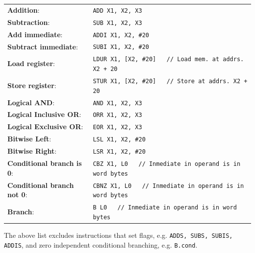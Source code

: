 \documentclass[11pt]{article}
\begin{document}
\begin{tcolorbox}[
    enhanced,
    attach boxed title to top left={xshift=6mm,yshift=-1.5mm},
    colback=moonstoneblue!20,
    colframe=moonstoneblue,
    colbacktitle=moonstoneblue,
    title=Relevant LEGv8 instructions,
    fonttitle=\bfseries\color{white},
    boxed title style={size=small,colframe=moonstoneblue,sharp corners},
    sharp corners,
]
    \begin{tabular}{@{} l @{\quad} l @{}}
    {\color{moondark}\textbf{Addition}}:           & \texttt{ADD X1, X2, X3}     \\
    {\color{moondark}\textbf{Subtraction}}:        & \texttt{SUB X1, X2, X3}     \\
    {\color{moondark}\textbf{Add immediate}}:      & \texttt{ADDI X1, X2, \#20}  \\
    {\color{moondark}\textbf{Subtract immediate}}: & \texttt{SUBI X1, X2, \#20}  \\
    {\color{moondark}\textbf{Load register}}:      & \texttt{LDUR X1, [X2, \#20] \ \ // Load mem. at addrs. X2 + 20} \\
    {\color{moondark}\textbf{Store register}}:     & \texttt{STUR X1, [X2, \#20] \ \ // Store at addrs. X2 + 20} \\
    {\color{moondark}\textbf{Logical AND}}:        & \texttt{AND X1, X2, X3}  \\
    {\color{moondark}\textbf{Logical Inclusive OR}}: & \texttt{ORR X1, X2, X3}  \\
    {\color{moondark}\textbf{Logical Exclusive OR}}: & \texttt{EOR X1, X2, X3}  \\
    {\color{moondark}\textbf{Bitwise Left}}:       & \texttt{LSL X1, X2, \#20}  \\
    {\color{moondark}\textbf{Bitwise Right}}:      & \texttt{LSR X1, X2, \#20}  \\
    {\color{moondark}\textbf{Conditional branch is 0}}: & \texttt{CBZ X1, L0 \ \ // Inmediate in operand is in word bytes} \\
    {\color{moondark}\textbf{Conditional branch not 0}}: & \texttt{CBNZ X1, L0 \ \ // Inmediate in operand is in word bytes} \\
    {\color{moondark}\textbf{Branch}}:             & \texttt{B L0 \ \ // Inmediate in operand is in word bytes}
    \end{tabular}
\end{tcolorbox}

The above list excludes instructions that set flags, e.g. \texttt{ADDS, SUBS, SUBIS, ADDIS}, and zero independent conditional branching, e.g. \texttt{B.cond}.
\end{document}
